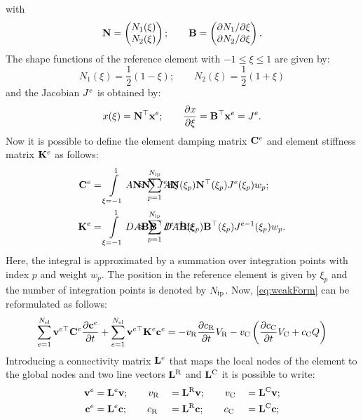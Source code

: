 \documentclass{article}
\begin{document}
  with
  \begin{equation}
    {\bf{N}} = \begin{pmatrix} N_1(\xi) \\ N_2(\xi) \end{pmatrix}; \qquad 
    {\bf{B}} = \begin{pmatrix} \partial N_1 / \partial \xi \\ \partial N_2 /\partial \xi \end{pmatrix}.
  \end{equation}
  The shape functions of the reference element with $-1\le\xi\le 1$ are given by:
  \begin{equation}
    N_1(\xi) = \frac{1}{2}(1-\xi); \qquad N_2(\xi) = \frac{1}{2}(1+\xi)
  \end{equation}
  and the Jacobian $J^{e}$ is obtained by:
  \begin{equation}
    x(\xi) = {\bf{N}}^{\top}{\bf{x}}^e ; \qquad \frac{\partial x}{\partial \xi} = {\bf{B}}^{\top} {\bf{x}}^e = J^{e}.
  \end{equation}
  Now it is possible to define the element damping matrix ${\bf{C}}^e$ and element stiffness matrix ${\bf{K}}^e$ as follows:
  \begin{align}
    \CCe &= \intXi A \NN \NNT \Je \dxi&&\hspace{-2.5cm}\approx \sumip A \NN(\xi_p) \NNT(\xi_p) \Je(\xi_p) w_p; \label{eq:CCe}\\
    \KKe &= \intXi D A \BB \BBT \Jeinv \dxi&&\hspace{-2.5cm}\approx \sumip D A \BB(\xi_p) \BBT(\xi_p) \Jeinv(\xi_p) w_p. \label{eq:KKe}
  \end{align}
  Here, the integral is approximated by a summation over integration points with index $p$ and weight $w_p$. The position in the reference element is given by $\xi_p$ and the number of integration points is denoted by $N_{\rm ip}$. Now, \cref{eq:weakForm} can be reformulated as follows:
  \begin{equation}
     \sum_{e=1}^{N_{\rm el}} {{\bf{v}}}^{e \top} {\bf{C}}^e \frac{\partial {\bf{c}}^e}{\partial t} + \sum_{e=1}^{N_{\rm el}} {{\bf{v}}}^{e \top} {\bf{K}}^e {\bf{c}}^e = - v_{\rm R} \frac{\partial c_{\rm R}}{\partial t} V_{\rm R} - v_{\rm C} \left( \frac{\partial c_{\rm C}}{\partial t} V_{\rm C} + c_{\rm C} Q\right)
     \label{eq:FEMe}
  \end{equation}
  Introducing a connectivity matrix ${\bf{L}}^{e}$ that maps the local nodes of the element to the global nodes and two line vectors ${\bf{L}}^{\rm R}$ and ${\bf{L}}^{\rm C}$ it is possible to write:
  \begin{alignat}{3}
    {\bf{v}}^e &= {\bf{L}}^{e} {\bf{v}}; \qquad v_{\rm R} &&= {\bf{L}}^{\rm R} {\bf{v}}; \qquad v_{\rm C} &&= {\bf{L}}^{\rm C} {\bf{v}}; \\
    {\bf{c}}^e &= {\bf{L}}^{e} {\bf{c}}; \qquad c_{\rm R} &&= {\bf{L}}^{\rm R} {\bf{c}}; \qquad c_{\rm C} &&= {\bf{L}}^{\rm C} {\bf{c}};
  \end{alignat}
\end{document}
